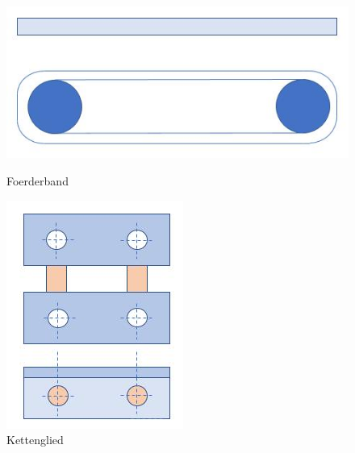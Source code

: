 \begin{figure}[H]
   \begin{minipage}[hbt]{.3\linewidth} %
      \includegraphics[width=\linewidth]{Bilder/Powerpoint/Foerderband}
      \caption{Foerderband}
      \label{Foerderband}
   \end{minipage}
   \hspace{.3\linewidth}%
   \begin{minipage}[hbt]{.2\linewidth} %
      \includegraphics[width=\linewidth]{Bilder/Powerpoint/Kettenglied}
      \caption{Kettenglied}
	  \label{Kettenglied}      
      \end{minipage}
\end{figure}

